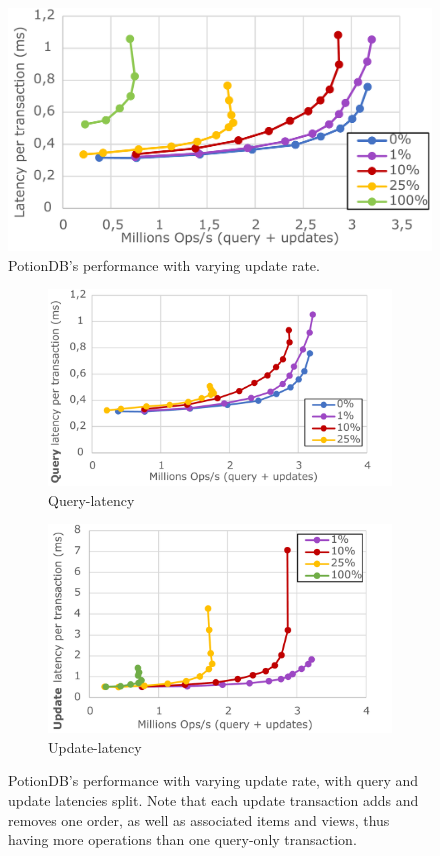\documentclass[sigplan,10pt]{acmart}
\begin{document}
\begin{figure}[h]
	\centering
	\includegraphics[width=.75\linewidth]{updRate_global_cut}
	\caption{PotionDB's performance with varying update rate.}
	\label{fig:(new_2)update_rates}
\end{figure}
\begin{figure}[h]
	\centering
	\begin{subfigure}{.5\linewidth}
		\centering
		\includegraphics[width=.99\linewidth]{updRate_queryLatency_cut}
		\caption{Query-latency}
		\label{fig:(new)update_rates_query}
	\end{subfigure}%
	\begin{subfigure}{.5\linewidth}
		\centering
		\includegraphics[width=.99\linewidth]{updRate_updateLatency_cut}
		\caption{Update-latency}
		\label{fig:(new)update_rates_update}
	\end{subfigure}
	\caption{PotionDB's performance with varying update rate, with query and update latencies split. Note that each update transaction adds and removes one order, as well as associated items and views, thus having more operations than one query-only transaction.}
	\label{fig:(new)update_rates_split}
\end{figure}
\end{document}
